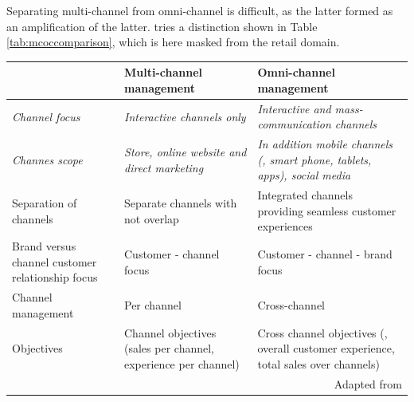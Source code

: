 		Separating multi-channel from omni-channel is difficult, as the latter formed as an amplification of the latter. \citeauthor{vorhoef2015retail} tries a distinction shown in Table \ref{tab:mcoccomparison}, which is here masked from the retail domain. 
		
		\begin{table}[caption={Multi- and omni-channel comparison}, label={tab:mcoccomparison}]
			\centering
			\begin{tabular}{p{3cm}| p{5cm} |p{5cm}} 
				& \textbf{Multi-channel management}                                   & \textbf{Omni-channel management}                                                              \\ \hline
				\textit{Channel focus}                         & \textit{Interactive channels only}                                    & \textit{Interactive and mass-communication channels}                                                   \\ \hline
				\textit{Channes scope}                                 & \textit{Store, online website and direct marketing}                          & \textit{In addition mobile channels (\ie, smart phone, tablets, apps), social media}                   \\ \hline
				{Separation of channels}                           & Separate channels with not overlap                                  & Integrated channels providing seamless customer experiences                                   \\ \hline
				{Brand versus channel customer relationship focus} & Customer - channel focus                                            & Customer - channel - brand  focus                                                              \\ \hline
				{Channel management}                               & Per channel                                                         & Cross-channel                                                                                 \\ \hline
				{Objectives}                                       & Channel objectives (\ie sales per channel, experience per channel)& Cross channel objectives (\ie, overall customer experience, total sales over channels) \\
				\multicolumn{3}{r}{Adapted from \citep[\p{176}]{vorhoef2015retail}}
			\end{tabular}
		\end{table}
